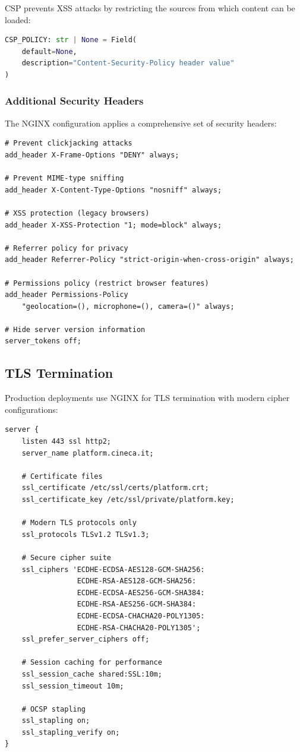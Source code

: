 CSP prevents XSS attacks by restricting the sources from which content can be loaded:

\begin{lstlisting}[language=Python, caption=CSP configuration]
CSP_POLICY: str | None = Field(
    default=None, 
    description="Content-Security-Policy header value"
)
\end{lstlisting}

\subsubsection{Additional Security Headers}

The NGINX configuration applies a comprehensive set of security headers:

\begin{lstlisting}[language=nginx, caption=Security headers in NGINX configuration]
# Prevent clickjacking attacks
add_header X-Frame-Options "DENY" always;

# Prevent MIME-type sniffing
add_header X-Content-Type-Options "nosniff" always;

# XSS protection (legacy browsers)
add_header X-XSS-Protection "1; mode=block" always;

# Referrer policy for privacy
add_header Referrer-Policy "strict-origin-when-cross-origin" always;

# Permissions policy (restrict browser features)
add_header Permissions-Policy 
    "geolocation=(), microphone=(), camera=()" always;

# Hide server version information
server_tokens off;
\end{lstlisting}

\subsection{TLS Termination}

Production deployments use NGINX for TLS termination with modern cipher configurations:

\begin{lstlisting}[language=nginx, caption=TLS configuration in ops/nginx/nginx.conf]
server {
    listen 443 ssl http2;
    server_name platform.cineca.it;
    
    # Certificate files
    ssl_certificate /etc/ssl/certs/platform.crt;
    ssl_certificate_key /etc/ssl/private/platform.key;
    
    # Modern TLS protocols only
    ssl_protocols TLSv1.2 TLSv1.3;
    
    # Secure cipher suite
    ssl_ciphers 'ECDHE-ECDSA-AES128-GCM-SHA256:
                 ECDHE-RSA-AES128-GCM-SHA256:
                 ECDHE-ECDSA-AES256-GCM-SHA384:
                 ECDHE-RSA-AES256-GCM-SHA384:
                 ECDHE-ECDSA-CHACHA20-POLY1305:
                 ECDHE-RSA-CHACHA20-POLY1305';
    ssl_prefer_server_ciphers off;
    
    # Session caching for performance
    ssl_session_cache shared:SSL:10m;
    ssl_session_timeout 10m;
    
    # OCSP stapling
    ssl_stapling on;
    ssl_stapling_verify on;
}
\end{lstlisting}

